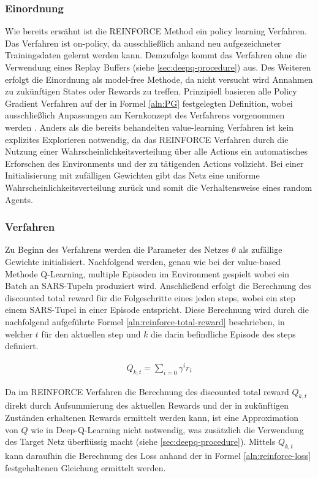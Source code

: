 \documentclass[11pt]{scrartcl}
\begin{document}
\subsubsection{Einordnung}
Wie bereits erwähnt ist die REINFORCE Method ein policy learning Verfahren. Das Verfahren ist
on-policy, da ausschließlich anhand neu aufgezeichneter Trainingsdaten gelernt werden kann.
Demzufolge kommt das Verfahren ohne die Verwendung eines Replay Buffers (siehe 
\autoref{sec:deepq-procedure}) aus. Des Weiteren erfolgt die Einordnung als model-free Methode,
da nicht versucht wird Annahmen zu zukünftigen States oder Rewards zu treffen. Prinzipiell
basieren alle Policy Gradient Verfahren auf der in Formel \ref{aln:PG} festgelegten Definition,
wobei ausschließlich Anpassungen am Kernkonzept des Verfahrens vorgenommen werden
\cite[~S.244 f.]{L2018}. Anders als die bereits behandelten value-learning Verfahren ist
kein explizites Explorieren notwendig, da das REINFORCE Verfahren durch die Nutzung einer
Wahrscheinlichkeitsverteilung über alle Actions ein automatisches \grqq Erforschen\grqq 
des Environments und der zu tätigenden Actions vollzieht. Bei einer Initialisierung mit
zufälligen Gewichten gibt das Netz eine uniforme Wahrscheinlichkeitsverteilung zurück und
somit die Verhaltensweise eines random Agents.


\subsubsection{Verfahren}
Zu Beginn des Verfahrens werden die Parameter des Netzes $\theta$ als zufällige Gewichte
initialisiert. Nachfolgend werden, genau wie bei der value-based Methode Q-Learning,
multiple Episoden im Environment gespielt wobei ein Batch an SARS-Tupeln produziert wird.
Anschließend erfolgt die Berechnung des discounted total reward für die Folgeschritte eines
jeden steps, wobei ein step einem SARS-Tupel in einer Episode entspricht. Diese Berechnung
wird durch die nachfolgend aufgeführte Formel \ref{aln:reinforce-total-reward} beschrieben,
in welcher $t$ für den aktuellen step und $k$ die darin befindliche Episode des steps
definiert. 

\begin{align}
Q_{k,t}=\sum_{i=0} \gamma^{i}r_{i}
\label{aln:reinforce-total-reward}
\end{align}

Da im REINFORCE Verfahren die Berechnung des discounted total reward $Q_{k,t}$ direkt durch
Aufsummierung des aktuellen Rewards und der in zukünftigen Zuständen erhaltenen Rewards
ermittelt werden kann, ist eine Approximation von $Q$ wie in Deep-Q-Learning nicht notwendig,
was zusätzlich die Verwendung des Target Netz überflüssig macht (siehe 
\autoref{sec:deepq-procedure}). Mittels $Q_{k,t}$ kann daraufhin die Berechnung des Loss
anhand der in Formel \ref{aln:reinforce-loss} festgehaltenen Gleichung ermittelt werden.
\end{document}
